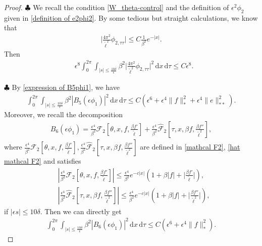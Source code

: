 \documentclass[10pt, reqno]{amsart}
\numberwithin{equation}{section}
\theoremstyle{definition}
\begin{document}
{{\begin{proof}
\smallskip\noindent$\clubsuit$
We recall the condition \eqref{W_theta-control} and the definition of $\epsilon^2 \phi_2$ given in \eqref{definition of e2phi2}. By some tedious but straight calculations, we know that
\begin{align}
\Big|\frac{4\pi^2}{{\tilde\ell}^2} \phi_{2, \tau\tau}\Big| \le C \frac{1} {\beta^2} e^{-|x|}.
\end{align}
Then
\begin{align} \label{estimate in mathcal S-L2-6}
 & \epsilon^8\int_0^{2\pi} \int_{|s| \le \frac{10\delta} \epsilon}
 \beta^2 \Big|\frac{4\pi^2}{{\tilde\ell}^2} {\phi}_{2, \tau\tau} \Big|^2 \,{\mathrm d}x \,{\mathrm d}\tau \le C\epsilon^8.
\end{align}

\smallskip\noindent$\clubsuit$
By \eqref{expression of B5phi1}, we have
\begin{align} \label{estimate in mathcal S-L2-7}
\int_0^{2\pi} \int_{|s| \le \frac{10\delta} \epsilon}
\beta^2\left| B_{5}(\epsilon\phi_1) \right|^2 \,{\mathrm d}x \,{\mathrm d}\tau \le C \left(\epsilon^6+ \epsilon^4 \|f\|_*^2+ \epsilon^4\|e\|_{**}^2 \right).
\end{align}
 Moreover, we recall the decomposition
\begin{align*}
 B_6(\epsilon\phi_1) = \frac{\epsilon^4}{\beta^2} \mathcal F_2\left[\theta, x, f, \frac{\beta f'}{\tilde\ell}\right]+ \frac{\epsilon^4}{\beta^2} \hat{\mathcal F}_2\left[\tau, x, \beta f, \frac{\beta f''}{\tilde\ell^2} \right],
\end{align*}
where $\frac{\epsilon^4}{\beta^2} \mathcal F_2\left[\theta, x, f, \frac{\beta f'}{\tilde\ell}\right], \frac{\epsilon^4}{\beta^2} \hat{\mathcal F}_2\left[\tau, x, \beta f, \frac{\beta f''}{\tilde\ell^2} \right]$ are defined in \eqref{mathcal F2}, \eqref{hat mathcal F2}
and satisfies
\begin{align*}
& \left|\frac{\epsilon^4}{\beta^2} \mathcal F_2\left[\theta, x, f, \frac{\beta f'}{\tilde\ell}\right]\right| \le \frac{\epsilon^4}{\beta^2} e^{-c|x|} \left( 1+ \beta |f| +\Big|\frac{\beta f'}{\tilde\ell}\Big| \right),
\\[2mm]
 &\left| \frac{\epsilon^4}{\beta^2} \hat{\mathcal F}_2\left[\tau, x, \beta f, \frac{\beta f''}{\tilde\ell^2} \right]\right| \le \frac{\epsilon^4}{\beta^2} e^{-c|x|} \left( 1+ \beta |f| + \Big|\frac{\beta f''}{\tilde\ell^2}\Big| \right),
\end{align*}
if $|\epsilon s| \le 10\delta$.
Then we can directly get
\begin{align} \label{estimate in mathcal S-L2-8}
\int_0^{2\pi} \int_{|s| \le \frac{10\delta} \epsilon} \beta^2\left| B_{6}(\epsilon\phi_1) \right|^2 \,{\mathrm d}x \,{\mathrm d}\tau \le C \left(\epsilon^6+ \epsilon^4 \|f\|_*^2 \right).
\end{align}


\end{proof}}}
\end{document}
